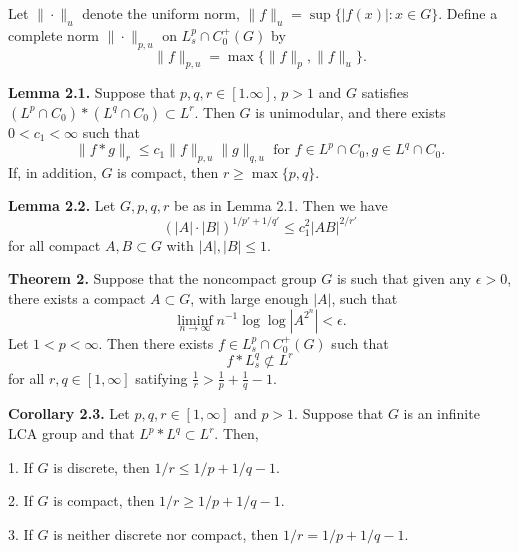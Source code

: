 \documentclass[landscape]{slides}
\begin{document}
\begin{slide}
Let $\|\cdot\|_u$ denote the uniform norm, $\|f\|_u = \sup\{|f(x)|:x\in G\}$.  Define a complete norm $\|\cdot\|_{p,u}$ on $L^p_s \cap C^+_{0}(G)$ by $$\|f\|_{p,u} = \max\{\|f\|_{p},\|f\|_u\}.$$

\textbf{Lemma 2.1.}  Suppose that $p,q,r \in [1.\infty]$, $p>1$ and $G$ satisfies $(L^p\cap C_0)*(L^q\cap C_0) \subset L^r$.  Then $G$ is unimodular, and there exists $0<c_1<\infty$ such that
$$\|f*g\|_r \leq c_1\|f\|_{p,u}\|g\|_{q,u}\mbox{ for } f\in L^p\cap C_0, g\in L^q\cap C_0.$$
If, in addition, $G$ is compact, then $r\geq\max\{p,q\}$.

\textbf{Lemma 2.2.}  Let $G,p,q,r$ be as in Lemma 2.1.  Then we have
$$(|A|\cdot|B|)^{1/p'+1/q'} \leq c^2_1|AB|^{2/r'}$$
for all compact $A, B \subset G$ with $|A|,|B| \leq 1$.
\end{slide}

\begin{slide}
\textbf{Theorem 2.}  Suppose that the noncompact group $G$ is such that given any $\epsilon > 0$, there exists a compact $A \subset G$, with large enough $|A|$, such that
$$\liminf_{n \rightarrow \infty} n^{-1}\log\log|A^{2^n}| < \epsilon.$$
Let $1<p<\infty$.  Then there exists $f \in L^p_s \cap C^+_{0}(G)$ such that
$$f * L^q_s \not\subset L^r$$
for all $r,q \in [1,\infty]$ satifying $\frac{1}{r} > \frac{1}{p} + \frac{1}{q} -1.$

\textbf{Corollary 2.3.}  Let $p,q,r \in [1,\infty]$ and $p>1$.  Suppose that $G$ is an infinite LCA group and that $L^p*L^q \subset L^r$.  Then,
\begin{list}{}{\topsep -0.1in \itemsep -0.1in}
\item[1. ]If $G$ is discrete, then $1/r \leq 1/p+1/q-1$.
\item[2. ]If $G$ is compact, then $1/r \geq 1/p+1/q-1$.
\item[3. ]If $G$ is neither discrete nor compact, then $1/r = 1/p+1/q-1$.
\end{list}

\end{slide}
\end{document}
